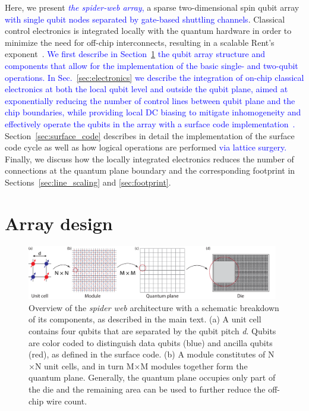\documentclass[aps,prl,reprint,superscriptaddress,floatfix]{revtex4-1}
\begin{document}
Here, we present \textcolor{blue}{\textit{the spider-web array},} a sparse two-dimensional spin qubit array \textcolor{blue}{with single qubit nodes separated by gate-based shuttling channels}.
Classical control electronics is integrated locally with the quantum hardware in order to minimize the need for off-chip interconnects, resulting in a scalable Rent’s exponent~\cite{Franke2019}.
\textcolor{blue}{We first describe in Section~\ref{sec:array_design} the qubit array structure and components that allow for the implementation of the basic single- and two-qubit operations.}
\textcolor{blue}{In Sec.~\ref{sec:electronics} we describe the integration of on-chip classical electronics at both the local qubit level and outside the qubit plane, aimed at exponentially reducing the number of control lines between qubit plane and the chip boundaries, while providing local DC biasing to mitigate inhomogeneity and effectively operate the qubits in the array with a surface code implementation~\cite{Horsman2012}.}
Section~\ref{sec:surface_code} describes in detail the implementation of the surface code cycle as well as how logical operations are performed \textcolor{blue}{via lattice surgery.}
Finally, we discuss how the locally integrated electronics reduces the number of connections at the quantum plane boundary and the corresponding footprint in Sections~\ref{sec:line_scaling} and \ref{sec:footprint}.

\section{Array design}
\label{sec:array_design}
\begin{figure}[t]
    \centering
    \includegraphics[width=0.98\textwidth]{Figure_1_array_schematic.pdf}
    \caption{Overview of the \textit{spider web} architecture with a schematic breakdown of its components, as described in the main text. (a) A unit cell contains four qubits that are separated by the qubit pitch \textit{d}. Qubits are color coded to distinguish data qubits (blue) and ancilla qubits (red), as defined in the surface code. (b) A module constitutes of N$\times$N unit cells, and in turn M$\times$M modules together form the quantum plane. Generally, the quantum plane occupies only part of the die and the remaining area can be used to further reduce the off-chip wire count.}
    \label{fig:overview}
\end{figure}
\end{document}
